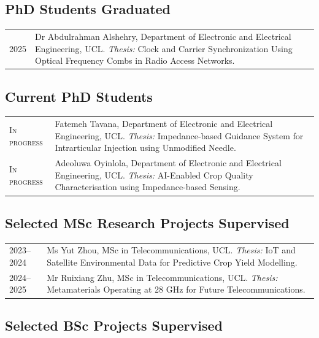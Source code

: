 \documentclass[a4paper,11pt]{article}
\newcommand{\cvitem}[2]{%
    \textsc{#1} & #2\\[2.5mm]
}
\begin{document}
\subsection*{PhD Students Graduated}

\begin{tabularx}{\textwidth}{>{\raggedleft\arraybackslash}p{2.4cm} X}

\cvitem{2025}{
Dr Abdulrahman Alshehry, Department of Electronic and Electrical Engineering, UCL.
\emph{Thesis:} Clock and Carrier Synchronization Using Optical Frequency Combs in Radio Access Networks.
}

\end{tabularx}

\subsection*{Current PhD Students}

\begin{tabularx}{\textwidth}{>{\raggedleft\arraybackslash}p{2.4cm} X}

\cvitem{In progress}{
Fatemeh Tavana, Department of Electronic and Electrical Engineering, UCL.
\emph{Thesis:} Impedance-based Guidance System for Intrarticular Injection using Unmodified Needle.
}

\cvitem{In progress}{
Adeoluwa Oyinlola, Department of Electronic and Electrical Engineering, UCL.
\emph{Thesis:} AI-Enabled Crop Quality Characterisation using Impedance-based Sensing.
}

\end{tabularx}

\subsection*{Selected MSc Research Projects Supervised}

\begin{tabularx}{\textwidth}{>{\raggedleft\arraybackslash}p{2.4cm} X}

\cvitem{2023--2024}{
Ms Yut Zhou, MSc in Telecommunications, UCL.
\emph{Thesis:} IoT and Satellite Environmental Data for Predictive Crop Yield Modelling.
}

\cvitem{2024--2025}{
Mr Ruixiang Zhu, MSc in Telecommunications, UCL.
\emph{Thesis:} Metamaterials Operating at 28 GHz for Future Telecommunications.
}

\end{tabularx}

\subsection*{Selected BSc Projects Supervised}
\end{document}
